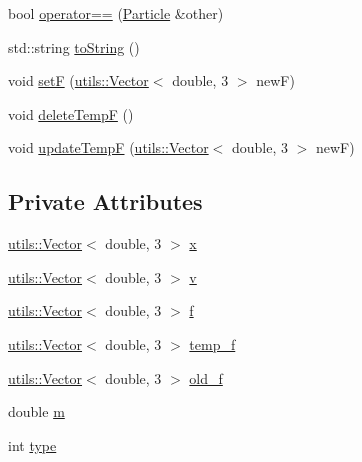 \begin{DoxyCompactItemize}
\item 
bool \hyperlink{classParticle_a5034babb77618a56e00927d8891afabe}{operator==} (\hyperlink{classParticle}{Particle} \&other)
\item 
std\-::string \hyperlink{classParticle_a07d071a0f91f8ce7413201a6db3afe7b}{to\-String} ()
\item 
void \hyperlink{classParticle_ae86d7fda94283bde380ea261333d8ac6}{set\-F} (\hyperlink{classutils_1_1Vector}{utils\-::\-Vector}$<$ double, 3 $>$ new\-F)
\item 
void \hyperlink{classParticle_ad467aec6031c428df7670ba5c7af9e28}{delete\-Temp\-F} ()
\item 
void \hyperlink{classParticle_ac7b9564f3f7ef87940216f9021cb5f61}{update\-Temp\-F} (\hyperlink{classutils_1_1Vector}{utils\-::\-Vector}$<$ double, 3 $>$ new\-F)
\end{DoxyCompactItemize}
\subsection*{Private Attributes}
\begin{DoxyCompactItemize}
\item 
\hyperlink{classutils_1_1Vector}{utils\-::\-Vector}$<$ double, 3 $>$ \hyperlink{classParticle_a3789900d6fe19a75d3a82cd5e9622c4c}{x}
\item 
\hyperlink{classutils_1_1Vector}{utils\-::\-Vector}$<$ double, 3 $>$ \hyperlink{classParticle_ac3669e50d83d8608d522965b9acd1d8b}{v}
\item 
\hyperlink{classutils_1_1Vector}{utils\-::\-Vector}$<$ double, 3 $>$ \hyperlink{classParticle_ad9aa3e171ea950b2cff1b4825e67845b}{f}
\item 
\hyperlink{classutils_1_1Vector}{utils\-::\-Vector}$<$ double, 3 $>$ \hyperlink{classParticle_aef8faa875660fc5da7392d577af9d419}{temp\-\_\-f}
\item 
\hyperlink{classutils_1_1Vector}{utils\-::\-Vector}$<$ double, 3 $>$ \hyperlink{classParticle_ad9281e33474f23f7261f28848affc4a4}{old\-\_\-f}
\item 
double \hyperlink{classParticle_aedcc7e1bc53b0e2b1a4a07c9a1b47563}{m}
\item 
int \hyperlink{classParticle_a2b73dd42bcd56ba2e7ffeb0a5515a866}{type}
\end{DoxyCompactItemize}


